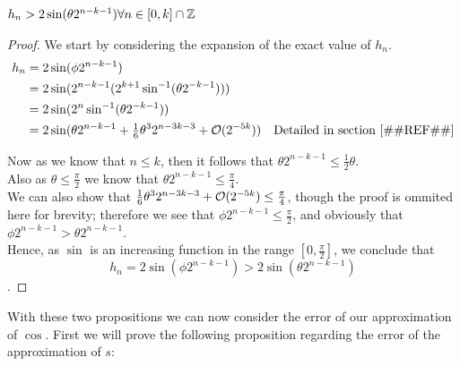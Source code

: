 \begin{Geo Trig Prop 2}
\label{THM_"Geo Trig Prop 2"}
\(h_n > 2\sin(\theta2^{n-k-1}) \forall n \in [0,k] \cap \mathbb{Z}\)
\end{Geo Trig Prop 2}
\begin{proof}
We start by considering the expansion of the exact value of \(h_n\).
\begin{displaymath}
	\begin{align*}
		h_n &= 2\sin(\phi2^{n-k-1})\\
			&= 2\sin(2^{n-k-1}(2^{k+1}\sin^{-1}(\theta2^{-k-1})))\\
			&= 2\sin(2^n\sin^{-1}(\theta2^{-k-1}))\\
			&= 2\sin(\theta2^{n-k-1} + \tfrac{1}{6}\theta^32^{n-3k -3} 
				+ \mathcal{O}(2^{-5k}))
				& \textrm{Detailed in section \ref{#REF#}}
	\end{align*}
\end{displaymath}

Now as we know that \(n \le k\), then it follows that \(\theta2^{n-k-1} \le \tfrac{1}{2}\theta\).\\

Also as \(\theta \le \tfrac{\pi}{2}\) we know that \(\theta2^{n-k-1} \le \tfrac{\pi}{4}\).\\

We can also show that \(\tfrac{1}{6}\theta^32^{n-3k-3} + \mathcal{O}(2^{-5k}) \le \tfrac{\pi}{4}\), though the proof is ommited here for brevity; therefore we see that \(\phi2^{n-k-1} \le \tfrac{\pi}{2}\), and obviously that \(\phi2^{n-k-1} > \theta2^{n-k-1}\).\\

Hence, as \(\sin\) is an increasing function in the range \([0, \tfrac{\pi}{2}]\), we conclude that \[h_n = 2\sin(\phi2^{n-k-1}) > 2\sin(\theta2^{n-k-1})\].
\end{proof}

With these two propositions we can now consider the error of our approximation of \(\cos\). First we will prove the following proposition regarding the error of the approximation of \(s\):

